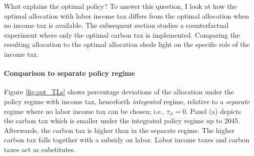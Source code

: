  What explains the optimal policy? To answer this question, I look at how the optimal allocation with labor income tax differs from the optimal allocation when no income tax is available. 
 The subsequent section studies a counterfactual experiment where only the optimal carbon tax is implemented. Comparing the resulting allocation to the optimal allocation sheds light on the specific role of the income tax. 


	
\paragraph{Comparison to separate policy regime}

Figure \ref{fig:opt_TLs} shows percentage deviations of the allocation under the policy regime with income tax, henceforth \textit{integrated} regime, relative to a \textit{separate} regime where no labor income tax can be chosen; i.e., $\tau_{\iota t}=0$.  
Panel (a) depicts the carbon tax which is smaller under the integrated policy regime up to 2045. Afterwards, the carbon tax is higher than in the separate regime. The higher carbon tax falls together with a subsidy on labor.
Labor income taxes and carbon taxes act as substitutes. 


